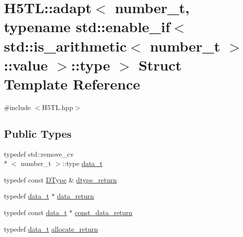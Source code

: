 \hypertarget{struct_h5_t_l_1_1adapt_3_01number__t_00_01typename_01std_1_1enable__if_3_01std_1_1is__arithmetic58ffd9dad45132ac3625c2d53f8565f6}{\section{H5\-T\-L\-:\-:adapt$<$ number\-\_\-t, typename std\-:\-:enable\-\_\-if$<$ std\-:\-:is\-\_\-arithmetic$<$ number\-\_\-t $>$\-:\-:value $>$\-:\-:type $>$ Struct Template Reference}
\label{struct_h5_t_l_1_1adapt_3_01number__t_00_01typename_01std_1_1enable__if_3_01std_1_1is__arithmetic58ffd9dad45132ac3625c2d53f8565f6}
}


{\ttfamily \#include $<$H5\-T\-L.\-hpp$>$}

\subsection*{Public Types}
\begin{DoxyCompactItemize}
\item 
typedef std\-::remove\-\_\-cv\\*
$<$ number\-\_\-t $>$\-::type \hyperlink{struct_h5_t_l_1_1adapt_3_01number__t_00_01typename_01std_1_1enable__if_3_01std_1_1is__arithmetic58ffd9dad45132ac3625c2d53f8565f6_af146052bd299f7493cece962909aa436}{data\-\_\-t}
\item 
typedef const \hyperlink{class_h5_t_l_1_1_d_type}{D\-Type} \& \hyperlink{struct_h5_t_l_1_1adapt_3_01number__t_00_01typename_01std_1_1enable__if_3_01std_1_1is__arithmetic58ffd9dad45132ac3625c2d53f8565f6_aa2727e0b2bd78a930fbe64fb65c30030}{dtype\-\_\-return}
\item 
typedef \hyperlink{struct_h5_t_l_1_1adapt_3_01number__t_00_01typename_01std_1_1enable__if_3_01std_1_1is__arithmetic58ffd9dad45132ac3625c2d53f8565f6_af146052bd299f7493cece962909aa436}{data\-\_\-t} $\ast$ \hyperlink{struct_h5_t_l_1_1adapt_3_01number__t_00_01typename_01std_1_1enable__if_3_01std_1_1is__arithmetic58ffd9dad45132ac3625c2d53f8565f6_a21184722476c05c54c5ef7f5b8e88ba8}{data\-\_\-return}
\item 
typedef const \hyperlink{struct_h5_t_l_1_1adapt_3_01number__t_00_01typename_01std_1_1enable__if_3_01std_1_1is__arithmetic58ffd9dad45132ac3625c2d53f8565f6_af146052bd299f7493cece962909aa436}{data\-\_\-t} $\ast$ \hyperlink{struct_h5_t_l_1_1adapt_3_01number__t_00_01typename_01std_1_1enable__if_3_01std_1_1is__arithmetic58ffd9dad45132ac3625c2d53f8565f6_ab8b5ea26cd3a943bdbbd30fdc39714a0}{const\-\_\-data\-\_\-return}
\item 
typedef \hyperlink{struct_h5_t_l_1_1adapt_3_01number__t_00_01typename_01std_1_1enable__if_3_01std_1_1is__arithmetic58ffd9dad45132ac3625c2d53f8565f6_af146052bd299f7493cece962909aa436}{data\-\_\-t} \hyperlink{struct_h5_t_l_1_1adapt_3_01number__t_00_01typename_01std_1_1enable__if_3_01std_1_1is__arithmetic58ffd9dad45132ac3625c2d53f8565f6_a7531d399303876bc9c931a5d4e0afe27}{allocate\-\_\-return}
\end{DoxyCompactItemize}
